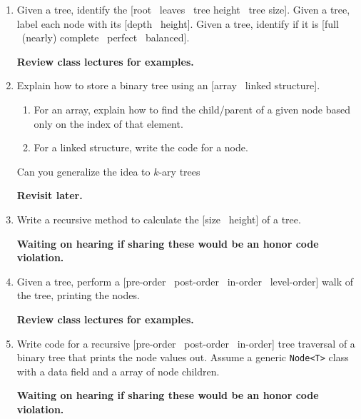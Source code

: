 \documentclass[10pt]{article}
\begin{document}
\begin{enumerate}[leftmargin=0em]
\item Given a tree, identify the [root \vline\ leaves \vline\ tree height \vline\ tree size]. Given a tree, label each node with its [depth \vline\ height]. Given a tree, identify if it is [full \vline\ (nearly) complete \vline\ perfect \vline\ balanced].

\textbf{Review class lectures for examples.}
\item Explain how to store a binary tree using an [array \vline\ linked structure]. 
\begin{enumerate}
    \item For an array, explain how to find the child/parent of a given node based only on the index of that element.
    \item For a linked structure, write the code for a node.
\end{enumerate} 
Can you generalize the idea to $k$-ary trees

\textbf{Revisit later.}
\item Write a recursive method to calculate the [size \vline\ height] of a tree.

\textbf{Waiting on hearing if sharing these would be an honor code violation.}
\item Given a tree, perform a [pre-order \vline\ post-order \vline\ in-order \vline\ level-order] walk of the tree, printing the nodes.

\textbf{Review class lectures for examples.}
\item Write code for a recursive [pre-order \vline\ post-order \vline\ in-order] tree traversal of a binary tree that prints the node values out. Assume a generic \texttt{Node<T>} class with a data field and a array of node children.

\textbf{Waiting on hearing if sharing these would be an honor code violation.}
\end{enumerate}
\end{document}

